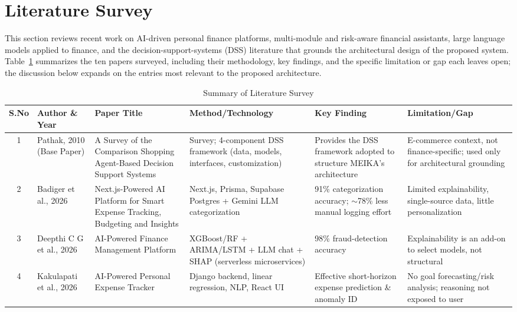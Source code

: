 \documentclass[conference]{IEEEtran}
\begin{document}
\section{Literature Survey}

This section reviews recent work on AI-driven personal finance platforms, multi-module and risk-aware financial assistants, large language models applied to finance, and the decision-support-systems (DSS) literature that grounds the architectural design of the proposed system. Table~\ref{tab:litsurvey} summarizes the ten papers surveyed, including their methodology, key findings, and the specific limitation or gap each leaves open; the discussion below expands on the entries most relevant to the proposed architecture.

\begin{table}[!t]
\centering
\caption{Summary of Literature Survey}
\label{tab:litsurvey}
\footnotesize
\renewcommand{\arraystretch}{1.3}
\begin{tabular}{|c|p{2.3cm}|p{4.3cm}|p{3.6cm}|p{3.3cm}|p{3.3cm}|}
\hline
\textbf{S.No} & \textbf{Author \& Year} & \textbf{Paper Title} & \textbf{Method/Technology} & \textbf{Key Finding} & \textbf{Limitation/Gap} \\
\hline
1 & Pathak, 2010 (Base Paper) \cite{pathak2010survey} & A Survey of the Comparison Shopping Agent-Based Decision Support Systems & Survey; 4-component DSS framework (data, models, interfaces, customization) & Provides the DSS framework adopted to structure MEIKA's architecture & E-commerce context, not finance-specific; used only for architectural grounding \\
\hline
2 & Badiger et al., 2026 \cite{badiger2026spendai} & Next.js-Powered AI Platform for Smart Expense Tracking, Budgeting and Insights & Next.js, Prisma, Supabase Postgres + Gemini LLM categorization & 91\% categorization accuracy; $\sim$78\% less manual logging effort & Limited explainability, single-source data, little personalization \\
\hline
3 & Deepthi C G et al., 2026 \cite{deepthi2026aipowered} & AI-Powered Finance Management Platform & XGBoost/RF + ARIMA/LSTM + LLM chat + SHAP (serverless microservices) & 98\% fraud-detection accuracy & Explainability is an add-on to select models, not structural \\
\hline
4 & Kakulapati et al., 2026 \cite{kakulapati2026expensetracker} & AI-Powered Personal Expense Tracker & Django backend, linear regression, NLP, React UI & Effective short-horizon expense prediction \& anomaly ID & No goal forecasting/risk analysis; reasoning not exposed to user \\

\end{tabular}
\end{table}
\end{document}
